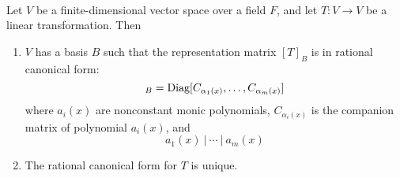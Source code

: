 \begin{theorem}
\label{thm:ercflt}
\\
Let $V$ be a finite-dimensional vector space over a field $F$, and let $T: V \rightarrow V$ be a linear transformation. Then
\begin{enumerate}[label=(\roman*)]
\item $V$ has a basis $B$ such that the representation matrix $[T]_B$ is in rational canonical form:
\begin{equation}
[T]_B = \textnormal{Diag}[C_{\alpha_1 (x)}, \ldots, C_{\alpha_m (x)}] \nonumber
\end{equation}
where $a_i(x)$ are nonconstant monic polynomials, $C_{\alpha_i (x)}$ is the companion matrix of polynomial $a_i(x)$, and
\begin{equation}
a_1(x) \ | \ \cdots \ | \ a_m(x) \nonumber
\end{equation}
\item The rational canonical form for $T$ is unique.
\end{enumerate}
\end{theorem}
